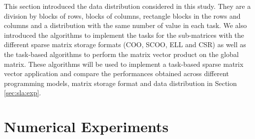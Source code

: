 This section introduced the data distribution considered in this study.
They are a division by blocks of rows, blocks of columns, rectangle blocks in the rows and columns and a distribution with the same number of value in each task.
We also introduced the algorithms to implement the tasks for the sub-matrices with the different sparse matrix storage formats (COO, SCOO, ELL and CSR) as well as the task-based algorithms to perform the matrix vector product on the global matrix.
These algorithms will be used to implement a task-based sparse matrix vector application and compare the performances obtained across different programming models, matrix storage format and data distribution in Section \ref{sec:sla:exp}.
\section{Numerical Experiments \label{sec:sla:exp}}
